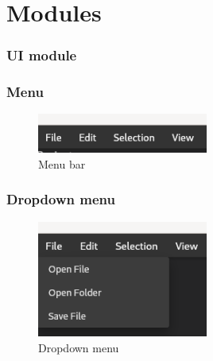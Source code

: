 \section{Modules}
\SectionPage

\begin{frame}
  \frametitle{UI module}
  \begin{figure}[H]
    \centering
    
  \end{figure}
\end{frame}

\begin{frame}
  \frametitle{Menu}
  \begin{figure}
    \centering
    \includegraphics[width=0.5\textwidth]{./pics/menu-bar.png}
    \caption{
      Menu bar
    }
  \end{figure}
\end{frame}

\begin{frame}
  \frametitle{Dropdown menu}
  \begin{figure}
    \centering
    \includegraphics[width=0.5\textwidth]{./pics/menu-dropdown.png}
    \caption{
      Dropdown menu
    }
  \end{figure}
\end{frame}

